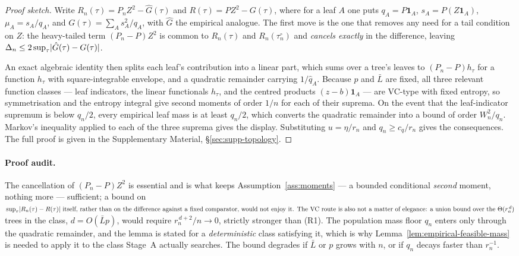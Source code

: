 \documentclass[11pt]{article}
\theoremstyle{plain}
\theoremstyle{definition}
\theoremstyle{remark}
\DeclarePairedDelimiter{\abs}{\lvert}{\rvert}
\begin{document}
\begin{proof}[Proof sketch]
Write \(R_n(\tau)=P_nZ^2-\hat G(\tau)\) and \(R(\tau)=PZ^2-G(\tau)\), where
for a leaf \(A\) one puts \(q_A=P\mathbf 1_A\), \(s_A=P(Z\mathbf 1_A)\),
\(\mu_A=s_A/q_A\), and \(G(\tau)=\sum_As_A^2/q_A\), with \(\hat G\) the
empirical analogue. The first move is the one that removes any need for a tail
condition on \(Z\): the heavy-tailed term \((P_n-P)Z^2\) is common to
\(R_n(\tau)\) and \(R_n(\tau_n^\circ)\) and \emph{cancels exactly} in the
difference, leaving \(\Delta_n\le2\sup_\tau\abs{\hat G(\tau)-G(\tau)}\).

An exact algebraic identity then splits each leaf's contribution into a linear
part, which sums over a tree's leaves to \((P_n-P)h_\tau\) for a function
\(h_\tau\) with square-integrable envelope, and a quadratic remainder carrying
\(1/\hat q_A\). Because \(p\) and \(\bar L\) are fixed, all three relevant
function classes --- leaf indicators, the linear functionals \(h_\tau\), and
the centred products \((z-b)\mathbf 1_A\) --- are VC-type with fixed entropy,
so symmetrisation and the entropy integral give second moments of order
\(1/n\) for each of their suprema. On the event that the leaf-indicator
supremum is below \(q_n/2\), every empirical leaf mass is at least \(q_n/2\),
which converts the quadratic remainder into a bound of order
\(W_n^2/q_n\). Markov's inequality applied to each of the three suprema gives
the display. Substituting \(u=\eta/r_n\) and \(q_n\ge c_q/r_n\) gives the
consequences. The full proof is given in the Supplementary Material,
\S\ref{sec:supp-topology}.
\end{proof}

\paragraph{Proof audit.}
The cancellation of \((P_n-P)Z^2\) is essential and is what keeps
Assumption~\ref{ass:moments} --- a bounded conditional \emph{second} moment,
nothing more --- sufficient; a bound on \(\sup_\tau\abs{R_n(\tau)-R(\tau)}$
itself, rather than on the difference against a fixed comparator, would not
enjoy it. The VC route is also not a matter of elegance: a union bound over
the \(\Theta(r_n^{\,d})\) trees in the class, \(d=O(\bar Lp)\), would require
\(r_n^{\,d+2}/n\to0\), strictly stronger than (R1). The population mass floor
\(q_n\) enters only through the quadratic remainder, and the lemma is stated
for a \emph{deterministic} class satisfying it, which is why
Lemma~\ref{lem:empirical-feasible-mass} is needed to apply it to the class
Stage~A actually searches. The bound degrades if \(\bar L\) or \(p\) grows
with \(n\), or if \(q_n\) decays faster than \(r_n^{-1}\).
\end{document}
